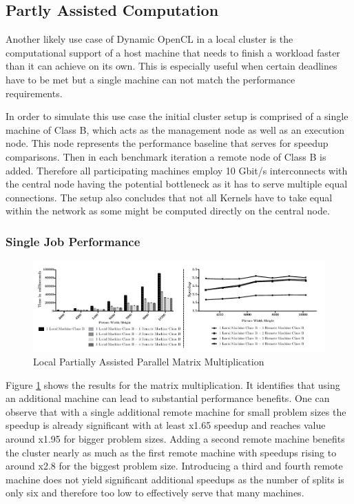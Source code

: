 \subsection{Partly Assisted Computation}

Another likely use case of Dynamic OpenCL in a local cluster is the computational support of a host machine that needs to finish a workload faster than it can achieve on its own. This is especially useful when certain deadlines have to be met but a single machine can not match the performance requirements.

In order to simulate this use case the initial cluster setup is comprised of a single machine of Class B, which acts as the management node as well as an execution node. This node represents the performance baseline that serves for speedup comparisons. Then in each benchmark iteration a remote node of Class B is added. Therefore all participating machines employ 10 Gbit/s interconnects with the central node having the potential bottleneck as it has to serve multiple equal connections. The setup also concludes that not all Kernels have to take equal within the network as some might be computed directly on the central node.

\subsubsection*{Single Job Performance}
\label{single_job_performance}

\begin{figure}[H]
	
	\includegraphics[width=1.0\textwidth]{images/local_partially_assisted_matrix.pdf}
	\centering
	\caption{Local Partially Assisted Parallel Matrix Multiplication}
	\label{img:parallel_matrix}
\end{figure}

Figure \ref{img:parallel_matrix} shows the results for the matrix multiplication. It identifies that using an additional machine can lead to substantial performance benefits. One can observe that with a single additional remote machine for small problem sizes the speedup is already significant with at least x1.65 speedup and reaches value around x1.95 for bigger problem sizes. Adding a second remote machine benefits the cluster nearly as much as the first remote machine with speedups rising to around x2.8 for the biggest problem size. Introducing a third and fourth remote machine does not yield significant additional speedups as the number of splits is only six and therefore too low to effectively serve that many machines.

